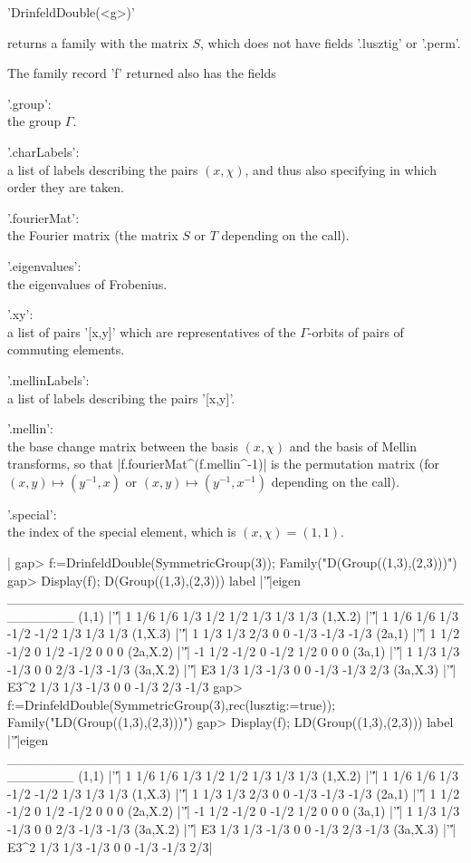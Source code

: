 'DrinfeldDouble(<g>)'

returns a family with the matrix $S$, which does not have fields '.lusztig'
or '.perm'.

The family record 'f' returned also has the fields\:

'.group':\\ the group $\Gamma$.

'.charLabels':\\  a list of labels describing  the pairs $(x,\chi)$, and thus
also specifying in which order they are taken.

'.fourierMat':\\ the Fourier matrix (the matrix $S$ or $T$ depending on the
call).

'.eigenvalues':\\ the eigenvalues of Frobenius.

'.xy':\\ a list of pairs '[x,y]' which are representatives of the
$\Gamma$-orbits of pairs of commuting elements.

'.mellinLabels':\\ a list of labels describing the pairs '[x,y]'.

'.mellin':\\  the base  change matrix  between the  basis $(x,\chi)$  and the
basis  of Mellin  transforms, so  that |f.fourierMat^(f.mellin^-1)|  is the
permutation matrix (for $(x,y)\mapsto(y^{-1},x)$ or
$(x,y)\mapsto(y^{-1},x^{-1})$ depending on the call).

'.special':\\ the index of the special element, which is $(x,\chi)=(1,1)$.

|    gap> f:=DrinfeldDouble(SymmetricGroup(3));
    Family("D(Group((1,3),(2,3)))")
    gap> Display(f);
    D(Group((1,3),(2,3)))
       label |'\|'|eigen
    _______________________________________________________
    (1,1)    |'\|'|    1 1/6  1/6  1/3  1/2  1/2  1/3  1/3  1/3
    (1,X.2)  |'\|'|    1 1/6  1/6  1/3 -1/2 -1/2  1/3  1/3  1/3
    (1,X.3)  |'\|'|    1 1/3  1/3  2/3    0    0 -1/3 -1/3 -1/3
    (2a,1)   |'\|'|    1 1/2 -1/2    0  1/2 -1/2    0    0    0
    (2a,X.2) |'\|'|   -1 1/2 -1/2    0 -1/2  1/2    0    0    0
    (3a,1)   |'\|'|    1 1/3  1/3 -1/3    0    0  2/3 -1/3 -1/3
    (3a,X.2) |'\|'|   E3 1/3  1/3 -1/3    0    0 -1/3 -1/3  2/3
    (3a,X.3) |'\|'| E3^2 1/3  1/3 -1/3    0    0 -1/3  2/3 -1/3
    gap> f:=DrinfeldDouble(SymmetricGroup(3),rec(lusztig:=true));
    Family("LD(Group((1,3),(2,3)))")
    gap> Display(f);
    LD(Group((1,3),(2,3)))
       label |'\|'|eigen
    _______________________________________________________
    (1,1)    |'\|'|    1 1/6  1/6  1/3  1/2  1/2  1/3  1/3  1/3
    (1,X.2)  |'\|'|    1 1/6  1/6  1/3 -1/2 -1/2  1/3  1/3  1/3
    (1,X.3)  |'\|'|    1 1/3  1/3  2/3    0    0 -1/3 -1/3 -1/3
    (2a,1)   |'\|'|    1 1/2 -1/2    0  1/2 -1/2    0    0    0
    (2a,X.2) |'\|'|   -1 1/2 -1/2    0 -1/2  1/2    0    0    0
    (3a,1)   |'\|'|    1 1/3  1/3 -1/3    0    0  2/3 -1/3 -1/3
    (3a,X.2) |'\|'|   E3 1/3  1/3 -1/3    0    0 -1/3  2/3 -1/3
    (3a,X.3) |'\|'| E3^2 1/3  1/3 -1/3    0    0 -1/3 -1/3  2/3|

